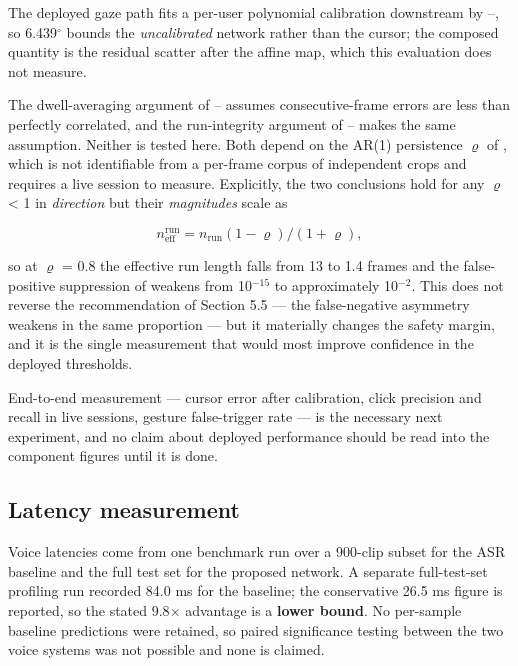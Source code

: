 The deployed gaze path fits a per-user polynomial calibration downstream by --, so 6.439$^{\circ}$ bounds the \emph{uncalibrated} network rather than the cursor; the composed quantity is the residual scatter after the affine map, which this evaluation does not measure.

The dwell-averaging argument of -- assumes consecutive-frame errors are less than perfectly correlated, and the run-integrity argument of -- makes the same assumption. Neither is tested here. Both depend on the AR(1) persistence $\varrho$ of , which is not identifiable from a per-frame corpus of independent crops and requires a live session to measure. Explicitly, the two conclusions hold for any $\varrho$ < 1 in \emph{direction} but their \emph{magnitudes} scale as

\begin{equation}
\label{eq:306}
n_{\mathrm{eff}}^{\mathrm{run}} = n_{\mathrm{run}} ( 1 - \varrho ) / ( 1 + \varrho ) ,
\end{equation}

so at $\varrho$ = 0.8 the effective run length falls from 13 to 1.4 frames and the false-positive suppression of  weakens from 10$^{-15}$ to approximately 10$^{-2}$. This does not reverse the recommendation of Section 5.5 --- the false-negative asymmetry weakens in the same proportion --- but it materially changes the safety margin, and it is the single measurement that would most improve confidence in the deployed thresholds.

End-to-end measurement --- cursor error after calibration, click precision and recall in live sessions, gesture false-trigger rate --- is the necessary next experiment, and no claim about deployed performance should be read into the component figures until it is done.

\FloatBarrier

\subsection{Latency measurement}

Voice latencies come from one benchmark run over a 900-clip subset for the ASR baseline and the full test set for the proposed network. A separate full-test-set profiling run recorded 84.0 ms for the baseline; the conservative 26.5 ms figure is reported, so the stated 9.8$\times$ advantage is a \textbf{lower bound}. No per-sample baseline predictions were retained, so paired significance testing between the two voice systems was not possible and none is claimed.

